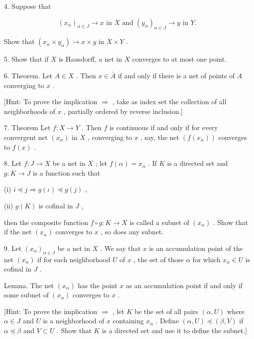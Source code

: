 4. Suppose that

\[
{\left( {x}_{\alpha }\right) }_{\alpha  \in  J} \rightarrow  x\text{ in }X\text{ and }{\left( {y}_{\alpha }\right) }_{\alpha  \in  J} \rightarrow  y\text{ in }Y.
\]

Show that \(\left( {{x}_{\alpha } \times  {y}_{\alpha }}\right)  \rightarrow  x \times  y\) in \(X \times  Y\) .

5. Show that if \(X\) is Hausdorff, a net in \(X\) converges to at most one point.

6. Theorem. Let \(A \in  X\) . Then \(x \in  \bar{A}\) if and only if there is a net of points of \(A\) converging to \(x\) .

[Hint: To prove the implication \(\Rightarrow\) , take as index set the collection of all neighborhoods of \(x\) , partially ordered by reverse inclusion.]

7. Theorem Let \(f : X \rightarrow  Y\) . Then \(f\) is continuous if and only if for every convergent net \(\left( {x}_{\alpha }\right)\) in \(X\) , converging to \(x\) , say, the net \(\left( {f\left( {x}_{\alpha }\right) }\right)\) converges to \(f\left( x\right)\) .

8. Let \(f : J \rightarrow  X\) be a net in \(X\) ; let \(f\left( \alpha \right)  = {x}_{\alpha }\) . If \(K\) is a directed set and \(g : K \rightarrow  J\) is a function such that

(i) \(i \preccurlyeq  j \Rightarrow  g\left( \iota \right)  \preccurlyeq  g\left( j\right)\) ,

(ii) \(g\left( K\right)\) is cofinal in \(J\) ,

then the composite function \(f \circ  g : K \rightarrow  X\) is called a subnet of \(\left( {x}_{\alpha }\right)\) . Show that if the net \(\left( {x}_{\alpha }\right)\) converges to \(x\) , so does any subnet.

9. Let \({\left( {x}_{\alpha }\right) }_{\alpha  \in  J}\) be a net in \(X\) . We say that \(x\) is an accumulation point of the net \(\left( {x}_{\alpha }\right)\) if for each neighborhood \(U\) of \(x\) , the set of those \(\alpha\) for which \({x}_{\alpha } \in  U\) is cofinal in \(J\) .

Lemma. The net \(\left( {x}_{\alpha }\right)\) has the point \(x\) as an accumulation point if and only if some subnet of \(\left( {x}_{\alpha }\right)\) converges to \(x\) .

[Hint: To prove the implication \(\Rightarrow\) , let \(K\) be the set of all pairs \(\left( {\alpha ,U}\right)\) where \(\alpha  \in  J\) and \(U\) is a neighborhood of \(x\) containing \({x}_{\alpha }\) . Define \(\left( {\alpha ,U}\right)  \preccurlyeq  \left( {\beta ,V}\right)\) if \(\alpha  \preccurlyeq  \beta\) and \(V \subset  U\) . Show that \(K\) is a directed set and use it to define the subnet.]

